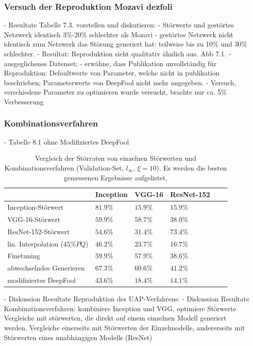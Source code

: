 \documentclass[runningheads]{llncs}
\begin{document}



\subsubsection{Versuch der Reproduktion Mozavi dezfoli}
		- Resultate Tabelle 7.3. vorstellen und diskutieren:
			- Störwerte und gestörtes Netzwerk identisch 3\%-20\% schlechter als Mozavi
			- gestörtes Netzwerk nicht identisch zum Netzwerk das Störung generiert hat: teilweise bis zu 10\% und 30\% schlechter. 
		- Resultat: Reproduktion sieht qualitativ ähnlich aus. Abb 7.1.
		- ausgeglichenes Datenset; 
		- erwähne, dass Publikation unvollständig für Reproduktion: Defaultwerte von Parameter, welche nicht in publikation beschrieben; Parameterwerte von DeepFool nicht mehr angegeben.
		- Versuch, verschiedene Parameter zu optimieren wurde versucht, brachte nur ca. 5\% Verbesserung
\subsubsection{Kombinationsverfahren}
- Tabelle	8.1 ohne Modifiziertes DeepFool
\begin{table}[]
\centering
\caption{Vergleich der Störraten von einzelnen Störwerten und Kombinationsverfahren (Validation-Set, $l_\infty$, $\xi=10$). Es werden die besten gemessenen Ergebnisse aufgelistet.}
\begin{tabular}{|l|l|l|l|l|l|}
\hline

											&	Inception	&	VGG-16		&	ResNet-152		\\ \hline
Inception-Störwert							&	$81.9\%$		&	$15.9\%$	&	$15.9\%$		\\
VGG-16-Störwert								&	$59.9\%$		&	$58.7\%$	&	$38.0\%$		\\
ResNet-152-Störwert							&	$54.6\%$		&	$31.4\%$	&	$73.4\%$		\\ \hline
lin. Interpolation ($45\% \overline{PQ}$)	&	$46.2\%$		&	$23.7\%$	&	$16.7\%$		\\
Finetuning									&	$59.9\%$		&	$57.9\%$	&	$38.6\%$		\\
abwechselndes Generieren						&	$67.3\%$		&	$60.6\%$	&	$41.2\%$		\\
modifiziertes DeepFool						&	$43.6\%$		&	$18.4\%$	&	$14.1\%$		\\


\hline 
\end{tabular}
\label{tbl_vergleich_comb}
\end{table}
- Diskussion Resultate Reproduktion des UAP-Verfahrens: 
- Diskussion Resultate Kombinationsverfahren: kombiniere Inception und VGG, optimiere Störwerte
Vergleiche mit störwerten, die direkt auf einem einzelnen Modell generiert werden. Vergleiche einerseits mit Störwerten der Einzelmodelle, andererseits mit Störwerten eines unabhängigen Modells (ResNet)
\end{document}
